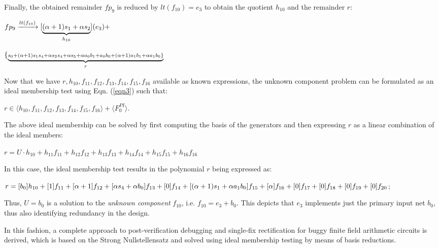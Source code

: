 \begin{Example}
Finally, the obtained remainder $fp_9$ is reduced by $lt(f_{10}) =
e_3$ to obtain the quotient $h_{10}$ and the remainder $r$: 

${ fp_9}\xrightarrow[]{{lt(f_{10})}}[\underbrace{{(\alpha+1)s_1+\alpha s_2}}_\text{$h_{10}$}]({e_3})+$ 

$\{\underbrace{{\scriptstyle s_0+(\alpha+1)s_1s_4+\alpha s_2s_4+\alpha s_5+\alpha a_0b_1+a_0b_0+(\alpha+1)a_1b_1+\alpha a_1b_0\}}}_\text{$r$}$ 

Now that we have $r,h_{10},f_{11},f_{12},f_{13},f_{14},f_{15},f_{16}$
available as known expressions, the unknown component problem can be
formulated as an ideal membership test using Eqn. (\ref{eqn3}) such that: 
\begin{center}
$r \in \langle h_{10},f_{11},f_{12},f_{13},f_{14},f_{15},f_{16}\rangle
  + \langle F_{0}^{PI}\rangle$.
\end{center}

The above ideal membership can be solved by first computing the
\Grobner basis of the generators and then expressing $r$ as a
linear combination of the ideal members: %

\begin{small}
$r = U\cdot h_{10} + h_{11}f_{11} + h_{12}f_{12}+h_{13}f_{13}+h_{14}f_{14}+h_{15}f_{15}+h_{16}f_{16}$ 
\end{small}

In this case, the ideal membership test results in the polynomial $r$
being expressed as: 


\begin{small}
$r = [b_0]h_{10}+[1]f_{11}+[\alpha+1]f_{12}+[\alpha s_4 +\alpha b_0]f_{13}+[0]f_{14}+[(\alpha+1)s_1+\alpha a_1b_0]f_{15}+[\alpha]f_{16}+[0]f_{17}+[0]f_{18}+[0]f_{19}+[0]f_{20}$;
\end{small}

Thus, $U=b_0$ is a solution to the \textit{unknown component}
$f_{10}$, i.e. $f_{10} = e_3 + b_0$. This depicts that $e_3$ implements
just the primary input net $b_0$, thus also identifying redundancy in
the design. 

\end{Example}

In this fashion, a complete approach to post-verification debugging
and single-fix rectification for buggy finite field arithmetic
circuits is derived, which is based on the Strong Nullstellensatz and
solved using ideal membership testing by means of \Grobner basis
reductions. 
